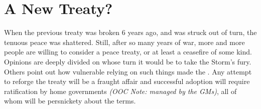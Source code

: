 \documentclass[blue]{GL2020}
\begin{document}
\section*{A New Treaty?}
When the previous treaty was broken 6 years ago, and \pShip{} was struck out of turn, the tenuous peace was shattered. Still, after so many years of war, more and more people are willing to consider a peace treaty, or at least a ceasefire of some kind. Opinions are deeply divided on whose turn it would be to take the Storm’s fury. Others point out how vulnerable relying on such things made the \pShip{}. Any attempt to reforge the treaty will be a fraught affair and successful adoption will require ratification by home governments \emph{(OOC Note: managed by the GMs)}, all of whom will be persnickety about the terms.
\end{document}

